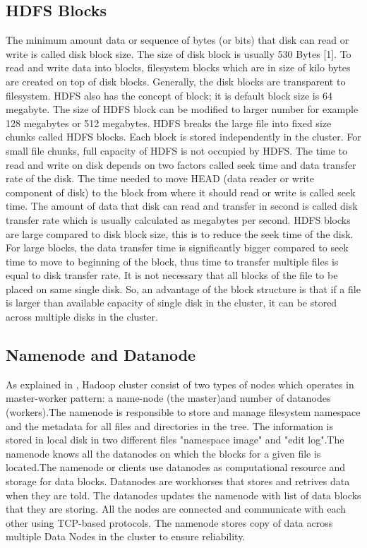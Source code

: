 \subsection{HDFS Blocks}
 
The minimum amount data or sequence of bytes (or bits) that disk can read or write is called disk block size. The size of disk block is usually 530 Bytes [1]. To read and write data into blocks, filesystem blocks which are in size of kilo bytes are created on top of disk blocks. Generally, the disk blocks are transparent to filesystem. 
HDFS also has the concept of block; it is default block size is 64 megabyte. The size of HDFS block can be modified to larger number for example 128 megabytes or 512 megabytes. HDFS breaks the large file into fixed size chunks called HDFS blocks. Each block is stored independently in the cluster. For small file chunks, full capacity of HDFS is not occupied by HDFS. 
The time to read and write on disk depends on two factors called seek time and data transfer rate of the disk. The time needed to move HEAD (data reader or write component of disk) to the block from where it should read or write is called seek time. The amount of data that disk can read and transfer in second is called disk transfer rate which is usually calculated as megabytes per second. HDFS blocks are large compared to disk block size, this is to reduce the seek time of the disk. For large blocks, the data transfer time is significantly bigger compared to seek time to move to beginning of the block, thus time to transfer multiple files is equal to disk transfer rate.
It is not necessary that all blocks of the file to be placed on same single disk.  So, an advantage of the block structure is that if a file is larger than available capacity of single disk in the cluster, it can be stored across multiple disks in the cluster. 



\subsection{Namenode and Datanode}

As explained in \cite{tom3}, Hadoop cluster consist of two types of nodes which operates in master-worker pattern: a name-node (the master)and number of datanodes (workers).The namenode is responsible to store and manage filesystem namespace and the metadata for all files and directories in the tree. The information is stored in local disk in two different files "namespace image" and "edit log".The namenode knows all the datanodes on which the blocks for a given file is located.The namenode or clients use datanodes as computational resource and storage for data blocks. Datanodes are workhorses that stores and retrives data when they are told. The datanodes updates the namenode with list of data blocks that they are storing. All the nodes are connected and communicate with each other using TCP-based protocols. The namenode stores copy of data across multiple Data Nodes in the cluster to ensure reliability.

